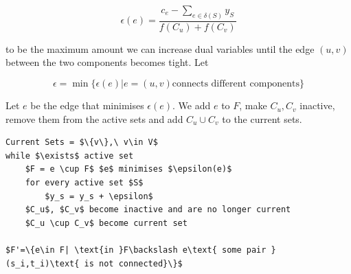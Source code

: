 \[\epsilon(e) = \frac{c_e - \sum_{e\in \delta(S)} y_S}{f(C_u)+f(C_v)}\]

to be the maximum amount we can increase dual variables until the edge $(u,v)$ between the two components becomes tight. Let 

\[\epsilon = \min \{\epsilon(e)|e=(u,v) \text{connects different components}\}\]

Let $e$ be the edge that minimises $\epsilon(e)$. We add $e$ to $F$, make $C_u,C_v$ inactive, remove them from the active sets and add $C_u\cup C_v$ to the current sets.

\begin{lstlisting}
Current Sets = $\{v\},\ v\in V$
while $\exists$ active set
	$F = e \cup F$ $e$ minimises $\epsilon(e)$
	for every active set $S$
		$y_s = y_s + \epsilon$
	$C_u$, $C_v$ become inactive and are no longer current
	$C_u \cup C_v$ become current set

$F'=\{e\in F| \text{in }F\backslash e\text{ some pair } (s_i,t_i)\text{ is not connected}\}$
\end{lstlisting}


